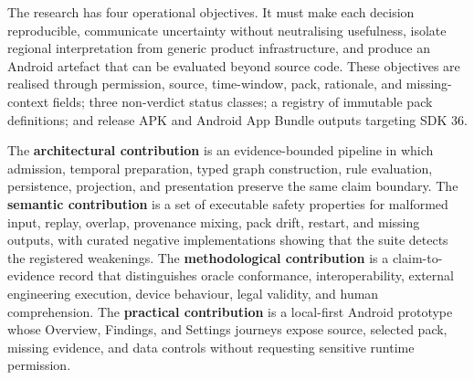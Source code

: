 The research has four operational objectives. It must make each decision reproducible, communicate uncertainty without neutralising usefulness, isolate regional interpretation from generic product infrastructure, and produce an Android artefact that can be evaluated beyond source code. These objectives are realised through permission, source, time-window, pack, rationale, and missing-context fields; three non-verdict status classes; a registry of immutable pack definitions; and release APK and Android App Bundle outputs targeting SDK 36.

The \textbf{architectural contribution} is an evidence-bounded pipeline in which admission, temporal preparation, typed graph construction, rule evaluation, persistence, projection, and presentation preserve the same claim boundary. The \textbf{semantic contribution} is a set of executable safety properties for malformed input, replay, overlap, provenance mixing, pack drift, restart, and missing outputs, with curated negative implementations showing that the suite detects the registered weakenings. The \textbf{methodological contribution} is a claim-to-evidence record that distinguishes oracle conformance, interoperability, external engineering execution, device behaviour, legal validity, and human comprehension. The \textbf{practical contribution} is a local-first Android prototype whose Overview, Findings, and Settings journeys expose source, selected pack, missing evidence, and data controls without requesting sensitive runtime permission.

